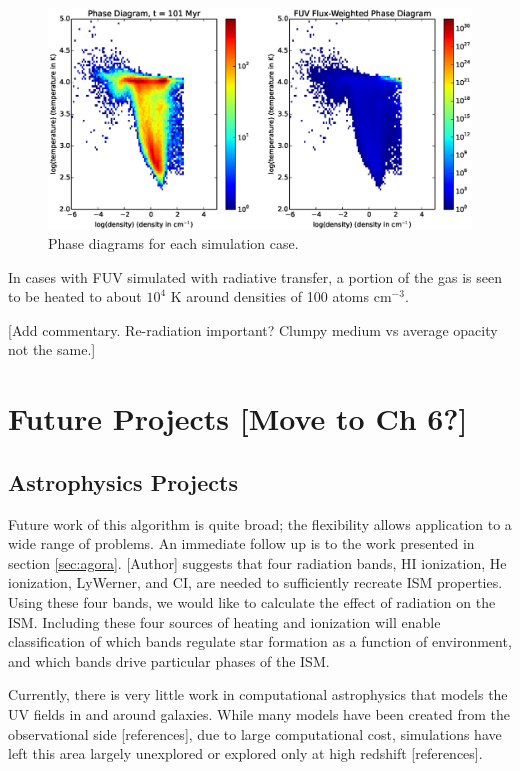 \begin{figure}
\includegraphics[width=\textwidth]{graphics/phaseRadFUV00101.eps}
\caption[Phase diagrams with different physics]{Phase diagrams for each simulation case.}
\label{fig:phasediagrams}
\end{figure}

In cases with FUV simulated with radiative transfer, a portion of the gas is seen to be heated to about $10^4$ K around densities of 100 atoms cm$^{-3}$.

[Add commentary. Re-radiation important? Clumpy medium vs average opacity not the same.]


\section{Future Projects [Move to Ch 6?]}
\label{sec:futurework}

\subsection{Astrophysics Projects}
\label{sec:astroprojects}

Future work of this algorithm is quite broad; the flexibility allows application to a wide range of problems. An immediate follow up is to the work presented in section \ref{sec:agora}. [Author] suggests that four radiation bands, HI ionization, He ionization, LyWerner, and CI, are needed to sufficiently recreate ISM properties. Using these four bands, we would like to calculate the effect of radiation on the ISM. Including these four sources of heating and ionization will enable classification of which bands regulate star formation as a function of environment, and which bands drive particular phases of the ISM.

Currently, there is very little work in computational astrophysics that models the UV fields in and around galaxies. While many models have been created from the observational side [references], due to large computational cost, simulations have left this area largely unexplored or explored only at high redshift [references].

